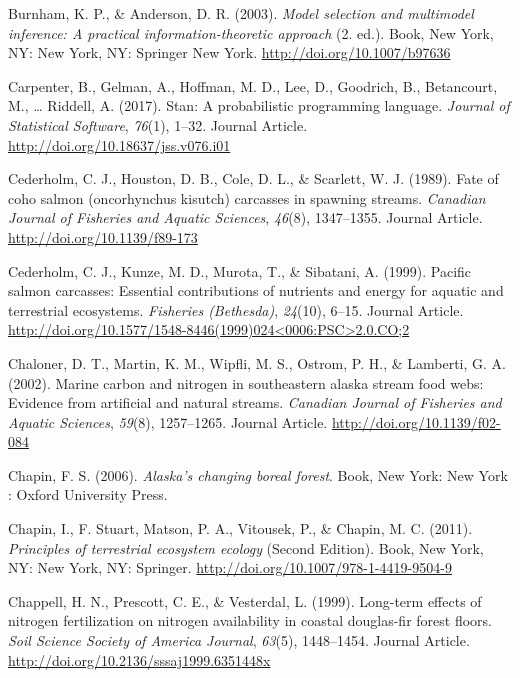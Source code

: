 \documentclass [11pt, proquest] {uwthesis}[2015/03/03]
\begin{document}
\hypertarget{ref-Burnham2003}{}
Burnham, K. P., \& Anderson, D. R. (2003). \emph{Model selection and
multimodel inference: A practical information-theoretic approach} (2.
ed.). Book, New York, NY: New York, NY: Springer New York.
\url{http://doi.org/10.1007/b97636}

\hypertarget{ref-Carpenter2017}{}
Carpenter, B., Gelman, A., Hoffman, M. D., Lee, D., Goodrich, B.,
Betancourt, M., \ldots{} Riddell, A. (2017). Stan: A probabilistic
programming language. \emph{Journal of Statistical Software},
\emph{76}(1), 1--32. Journal Article.
\url{http://doi.org/10.18637/jss.v076.i01}

\hypertarget{ref-Cederholm1989}{}
Cederholm, C. J., Houston, D. B., Cole, D. L., \& Scarlett, W. J.
(1989). Fate of coho salmon (oncorhynchus kisutch) carcasses in spawning
streams. \emph{Canadian Journal of Fisheries and Aquatic Sciences},
\emph{46}(8), 1347--1355. Journal Article.
\url{http://doi.org/10.1139/f89-173}

\hypertarget{ref-Cederholm1999}{}
Cederholm, C. J., Kunze, M. D., Murota, T., \& Sibatani, A. (1999).
Pacific salmon carcasses: Essential contributions of nutrients and
energy for aquatic and terrestrial ecosystems. \emph{Fisheries
(Bethesda)}, \emph{24}(10), 6--15. Journal Article.
\href{http://doi.org/10.1577/1548-8446(1999)024\%3C0006:PSC\%3E2.0.CO;2}{http://doi.org/10.1577/1548-8446(1999)024\textless{}0006:PSC\textgreater{}2.0.CO;2}

\hypertarget{ref-Chaloner2002}{}
Chaloner, D. T., Martin, K. M., Wipfli, M. S., Ostrom, P. H., \&
Lamberti, G. A. (2002). Marine carbon and nitrogen in southeastern
alaska stream food webs: Evidence from artificial and natural streams.
\emph{Canadian Journal of Fisheries and Aquatic Sciences}, \emph{59}(8),
1257--1265. Journal Article. \url{http://doi.org/10.1139/f02-084}

\hypertarget{ref-Chapin2006}{}
Chapin, F. S. (2006). \emph{Alaska's changing boreal forest}. Book, New
York: New York : Oxford University Press.

\hypertarget{ref-Chapin2011}{}
Chapin, I., F. Stuart, Matson, P. A., Vitousek, P., \& Chapin, M. C.
(2011). \emph{Principles of terrestrial ecosystem ecology} (Second
Edition). Book, New York, NY: New York, NY: Springer.
\url{http://doi.org/10.1007/978-1-4419-9504-9}

\hypertarget{ref-Chapell1999}{}
Chappell, H. N., Prescott, C. E., \& Vesterdal, L. (1999). Long-term
effects of nitrogen fertilization on nitrogen availability in coastal
douglas-fir forest floors. \emph{Soil Science Society of America
Journal}, \emph{63}(5), 1448--1454. Journal Article.
\url{http://doi.org/10.2136/sssaj1999.6351448x}
\end{document}
